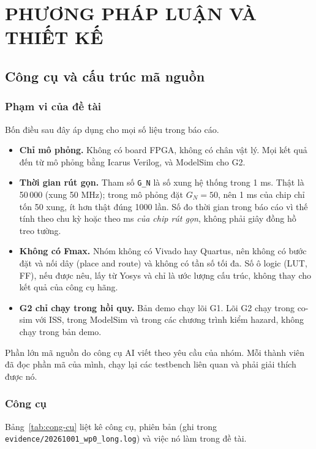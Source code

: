 \chapter{PHƯƠNG PHÁP LUẬN VÀ THIẾT KẾ}\label{chap:thiet-ke}

\section{Công cụ và cấu trúc mã nguồn}\label{sec:cong-cu}
\subsection{Phạm vi của đề tài}
Bốn điều sau đây áp dụng cho mọi số liệu trong báo cáo.
\begin{itemize}
  \item \textbf{Chỉ mô phỏng.} Không có board FPGA, không có chân vật lý. Mọi kết quả đến từ mô phỏng bằng Icarus Verilog, và ModelSim cho G2.
  \item \textbf{Thời gian rút gọn.} Tham số \texttt{G\_N} là số xung hệ thống trong 1 ms. Thật là 50\,000 (xung 50 MHz); trong mô phỏng đặt $G_N = 50$, nên 1 ms của chip chỉ tốn 50 xung, ít hơn thật đúng 1000 lần. Số đo thời gian trong báo cáo vì thế tính theo chu kỳ hoặc theo ms \emph{của chip rút gọn}, không phải giây đồng hồ treo tường.
  \item \textbf{Không có Fmax.} Nhóm không có Vivado hay Quartus, nên không có bước đặt và nối dây (place and route) và không có tần số tối đa. Số ô logic (LUT, FF), nếu được nêu, lấy từ Yosys và chỉ là ước lượng cấu trúc, không thay cho kết quả của công cụ hãng.
  \item \textbf{G2 chỉ chạy trong hồi quy.} Bản demo chạy lõi G1. Lõi G2 chạy trong co-sim với ISS, trong ModelSim và trong các chương trình kiểm hazard, không chạy trong bản demo.
\end{itemize}
Phần lớn mã nguồn do công cụ AI viết theo yêu cầu của nhóm. Mỗi thành viên đã đọc phần mã của mình, chạy lại các testbench liên quan và phải giải thích được nó.

\subsection{Công cụ}
Bảng~\ref{tab:cong-cu} liệt kê công cụ, phiên bản (ghi trong \texttt{evidence/20261001\_wp0\_long.log}) và việc nó làm trong đề tài.

